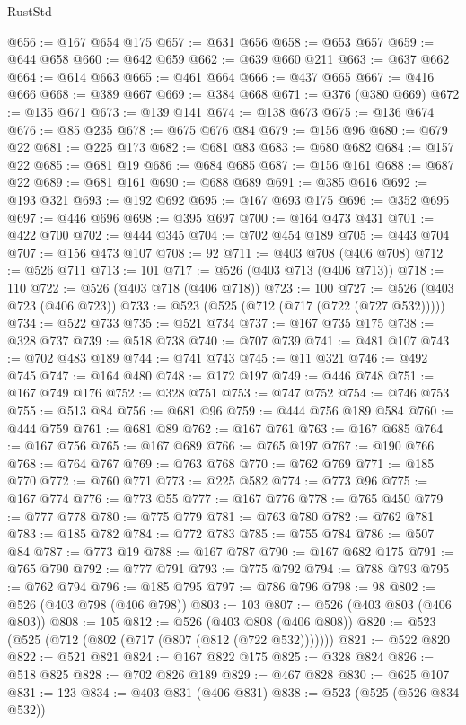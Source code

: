 \begin{lexlean}{RustStd}
\begin{coremodule}
@656 := @167 @654 @175
@657 := @631 @656
@658 := @653 @657
@659 := @644 @658
@660 := @642 @659
@662 := @639 @660 @211
@663 := @637 @662
@664 := @614 @663
@665 := @461 @664
@666 := @437 @665
@667 := @416 @666
@668 := @389 @667
@669 := @384 @668
@671 := @376 (@380 @669)
@672 := @135 @671
@673 := @139 @141
@674 := @138 @673
@675 := @136 @674
@676 := @85 @235
@678 := @675 @676 @84
@679 := @156 @96
@680 := @679 @22
@681 := @225 @173
@682 := @681 @83
@683 := @680 @682
@684 := @157 @22
@685 := @681 @19
@686 := @684 @685
@687 := @156 @161
@688 := @687 @22
@689 := @681 @161
@690 := @688 @689
@691 := @385 @616
@692 := @193 @321
@693 := @192 @692
@695 := @167 @693 @175
@696 := @352 @695
@697 := @446 @696
@698 := @395 @697
@700 := @164 @473 @431
@701 := @422 @700
@702 := @444 @345
@704 := @702 @454 @189
@705 := @443 @704
@707 := @156 @473 @107
@708 := 92
@711 := @403 @708 (@406 @708)
@712 := @526 @711
@713 := 101
@717 := @526 (@403 @713 (@406 @713))
@718 := 110
@722 := @526 (@403 @718 (@406 @718))
@723 := 100
@727 := @526 (@403 @723 (@406 @723))
@733 := @523 (@525 (@712 (@717 (@722 (@727 @532)))))
@734 := @522 @733
@735 := @521 @734
@737 := @167 @735 @175
@738 := @328 @737
@739 := @518 @738
@740 := @707 @739
@741 := @481 @107
@743 := @702 @483 @189
@744 := @741 @743
@745 := @11 @321
@746 := @492 @745
@747 := @164 @480
@748 := @172 @197
@749 := @446 @748
@751 := @167 @749 @176
@752 := @328 @751
@753 := @747 @752
@754 := @746 @753
@755 := @513 @84
@756 := @681 @96
@759 := @444 @756 @189 @584
@760 := @444 @759
@761 := @681 @89
@762 := @167 @761
@763 := @167 @685
@764 := @167 @756
@765 := @167 @689
@766 := @765 @197
@767 := @190 @766
@768 := @764 @767
@769 := @763 @768
@770 := @762 @769
@771 := @185 @770
@772 := @760 @771
@773 := @225 @582
@774 := @773 @96
@775 := @167 @774
@776 := @773 @55
@777 := @167 @776
@778 := @765 @450
@779 := @777 @778
@780 := @775 @779
@781 := @763 @780
@782 := @762 @781
@783 := @185 @782
@784 := @772 @783
@785 := @755 @784
@786 := @507 @84
@787 := @773 @19
@788 := @167 @787
@790 := @167 @682 @175
@791 := @765 @790
@792 := @777 @791
@793 := @775 @792
@794 := @788 @793
@795 := @762 @794
@796 := @185 @795
@797 := @786 @796
@798 := 98
@802 := @526 (@403 @798 (@406 @798))
@803 := 103
@807 := @526 (@403 @803 (@406 @803))
@808 := 105
@812 := @526 (@403 @808 (@406 @808))
@820 := @523 (@525 (@712 (@802 (@717 (@807 (@812 (@722 @532)))))))
@821 := @522 @820
@822 := @521 @821
@824 := @167 @822 @175
@825 := @328 @824
@826 := @518 @825
@828 := @702 @826 @189
@829 := @467 @828
@830 := @625 @107
@831 := 123
@834 := @403 @831 (@406 @831)
@838 := @523 (@525 (@526 @834 @532))

\end{coremodule}
\end{lexlean}
